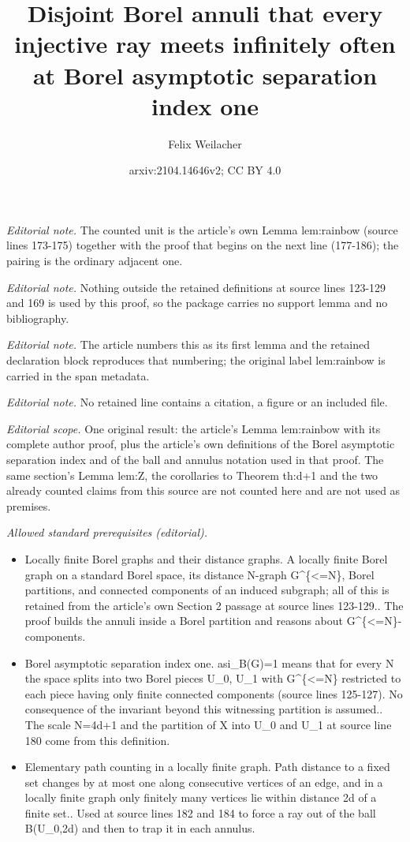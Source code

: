 \documentclass[12pt]{article}
\title{Disjoint Borel annuli that every injective ray meets infinitely often at Borel asymptotic separation index one}
\author{Felix Weilacher}
\date{arxiv:2104.14646v2; CC BY 4.0}
\newcommand{\0}{\varnothing}
\begin{document}
\maketitle
\noindent\textit{Editorial note.} The counted unit is the article's own Lemma lem:rainbow (source lines 173-175) together with the proof that begins on the next line (177-186); the pairing is the ordinary adjacent one.\par\medskip
\noindent\textit{Editorial note.} Nothing outside the retained definitions at source lines 123-129 and 169 is used by this proof, so the package carries no support lemma and no bibliography.\par\medskip
\noindent\textit{Editorial note.} The article numbers this as its first lemma and the retained declaration block reproduces that numbering; the original label lem:rainbow is carried in the span metadata.\par\medskip
\noindent\textit{Editorial note.} No retained line contains a citation, a figure or an included file.\par\medskip
\noindent\textit{Editorial scope.} One original result: the article's Lemma lem:rainbow with its complete author proof, plus the article's own definitions of the Borel asymptotic separation index and of the ball and annulus notation used in that proof. The same section's Lemma lem:Z, the corollaries to Theorem th:d+1 and the two already counted claims from this source are not counted here and are not used as premises.\par\medskip
\noindent\textit{Allowed standard prerequisites (editorial).}\begin{itemize}
\item Locally finite Borel graphs and their distance graphs. A locally finite Borel graph on a standard Borel space, its distance N-graph G\textasciicircum{}\{<=N\}, Borel partitions, and connected components of an induced subgraph; all of this is retained from the article's own Section 2 passage at source lines 123-129.. The proof builds the annuli inside a Borel partition and reasons about G\textasciicircum{}\{<=N\}-components.
\item Borel asymptotic separation index one. asi\_B(G)=1 means that for every N the space splits into two Borel pieces U\_0, U\_1 with G\textasciicircum{}\{<=N\} restricted to each piece having only finite connected components (source lines 125-127). No consequence of the invariant beyond this witnessing partition is assumed.. The scale N=4d+1 and the partition of X into U\_0 and U\_1 at source line 180 come from this definition.
\item Elementary path counting in a locally finite graph. Path distance to a fixed set changes by at most one along consecutive vertices of an edge, and in a locally finite graph only finitely many vertices lie within distance 2d of a finite set.. Used at source lines 182 and 184 to force a ray out of the ball B(U\_0,2d) and then to trap it in each annulus.
\end{itemize}\medskip
\end{document}
